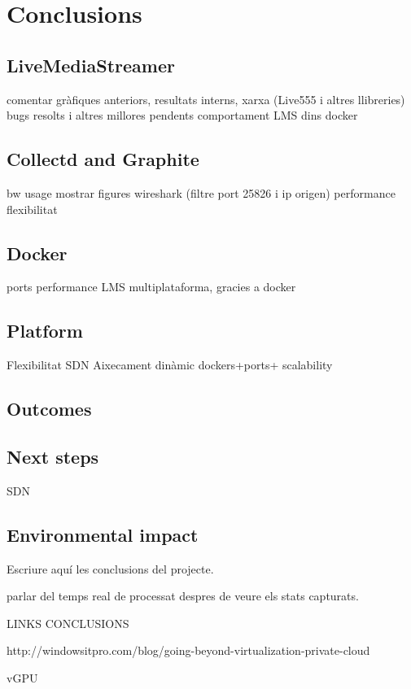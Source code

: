 \cleardoublepage
{}
\chapter*{Conclusions}\label{C:conclusions}

\section{LiveMediaStreamer}
comentar gràfiques anteriors, resultats interns, 
xarxa (Live555 i altres llibreries)
bugs resolts i altres millores pendents
comportament LMS dins docker

\section{Collectd and Graphite}
bw usage mostrar figures wireshark (filtre port 25826 i ip origen)
performance
flexibilitat

\section{Docker}
ports
performance
LMS multiplataforma, gracies a docker

\section{Platform}
Flexibilitat
SDN
Aixecament dinàmic dockers+ports+ scalability

\section{Outcomes}


\section{Next steps}
SDN

\section{Environmental impact}

Escriure aquí les conclusions del projecte. 

parlar del temps real de processat despres de veure els stats capturats.

LINKS CONCLUSIONS

http://windowsitpro.com/blog/going-beyond-virtualization-private-cloud

vGPU

